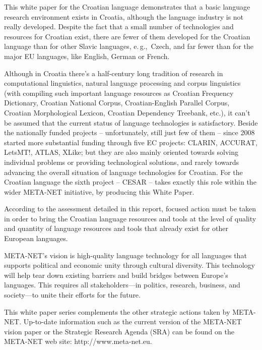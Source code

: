 \begin{multicols}{2}
This white paper for the Croatian language demonstrates that a basic language research environment exists in Croatia, although the language industry is not really developed. Despite the fact that a small number of technologies and resources for Croatian exist, there are fewer of them developed for the Croatian language than for other Slavic languages, e.\,g.,~Czech, and far fewer than for the major EU languages, like English, German or French. 

Although in Croatia there's a half-century long tradition of research in computational linguistics, natural language processing and corpus linguistics (with compiling such important language resources as Croatian Frequency Dictionary, Croatian National Corpus, Croatian-English Parallel Corpus, Croatian Morphological Lexicon, Croatian Dependency Treebank, etc.), it can't be assumed that the current status of language technologies is satisfactory. Beside the nationally funded projects -- unfortunately, still just few of them -- since 2008 started more substantial funding through five EC projects: CLARIN, ACCURAT, LetsMT!, ATLAS, XLike; but they are also mainly oriented towards solving individual problems or providing technological solutions, and rarely towards advancing the overall situation of language technologies for Croatian. For the Croatian language the sixth project -- CESAR -- takes exactly this role within the wider META-NET initiative, by producing this White Paper.

According to the assessment detailed in this report, focused action must be taken in order to bring the Croatian language resources and tools at the level of quality and quantity of language resources and tools that already exist for other European languages.

META-NET’s vision is high-quality language technology for all languages that supports political and economic unity through cultural diversity. This technology will help tear down existing barriers and build bridges between Europe’s languages. This requires all stakeholders—in politics, research, business, and society—to unite their efforts for the future.

This white paper series complements the other strategic actions taken by META-NET. Up-to-date information such as the current version of the META-NET vision paper \cite{str1} or the Strategic Research Agenda (SRA) can be found on the META-NET web site: http://www.meta-net.eu.
\end{multicols}
\clearpage

